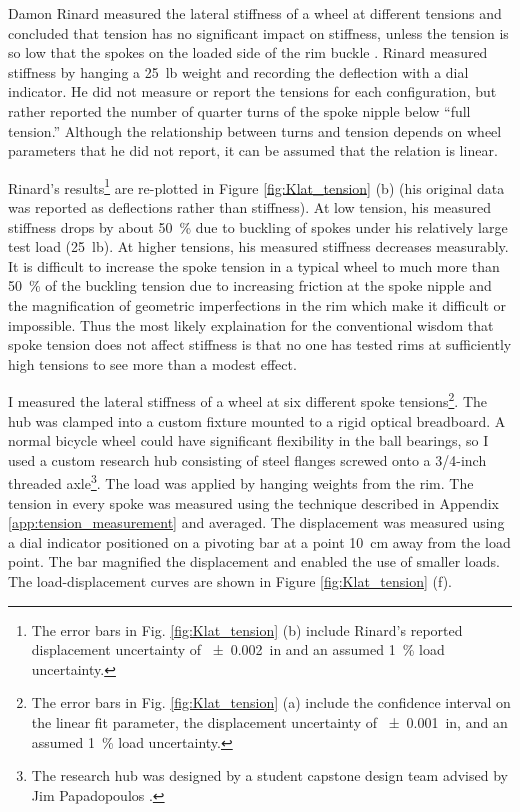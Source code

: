 \documentclass[\rootdir/thesis.tex]{subfiles}
\begin{document}
Damon Rinard measured the lateral stiffness of a wheel at different tensions and concluded that tension has no significant impact on stiffness, unless the tension is so low that the spokes on the loaded side of the rim buckle \cite{Rinard}. Rinard measured stiffness by hanging a \SI{25}{lb} weight and recording the deflection with a dial indicator. He did not measure or report the tensions for each configuration, but rather reported the number of quarter turns of the spoke nipple below ``full tension.'' Although the relationship between turns and tension depends on wheel parameters that he did not report, it can be assumed that the relation is linear.

Rinard's results\footnote{The error bars in Fig. \ref{fig:Klat_tension} (b) include Rinard's reported displacement uncertainty of \SI{+-0.002}{in} and an assumed \SI{1}{\percent} load uncertainty.} are re-plotted in Figure \ref{fig:Klat_tension} (b) (his original data was reported as deflections rather than stiffness). At low tension, his measured stiffness drops by about \SI{50}{\percent} due to buckling of spokes under his relatively large test load (\SI{25}{lb}). At higher tensions, his measured stiffness decreases measurably. It is difficult to increase the spoke tension in a typical wheel to much more than \SI{50}{\percent} of the buckling tension due to increasing friction at the spoke nipple and the magnification of geometric imperfections in the rim which make it difficult or impossible. Thus the most likely explaination for the conventional wisdom that spoke tension does not affect stiffness is that no one has tested rims at sufficiently high tensions to see more than a modest effect.

I measured the lateral stiffness of a wheel at six different spoke tensions\footnote{The error bars in Fig. \ref{fig:Klat_tension} (a) include the confidence interval on the linear fit parameter, the displacement uncertainty of \SI{+-0.001}{in}, and an assumed \SI{1}{\percent} load uncertainty.}. The hub was clamped into a custom fixture mounted to a rigid optical breadboard. A normal bicycle wheel could have significant flexibility in the ball bearings, so I used a custom research hub consisting of steel flanges screwed onto a 3/4-inch threaded axle\footnote{The research hub was designed by a student capstone design team advised by Jim Papadopoulos \cite{Alim2016}.}. The load was applied by hanging weights from the rim. The tension in every spoke was measured using the technique described in Appendix \ref{app:tension_measurement} and averaged. The displacement was measured using a dial indicator positioned on a pivoting bar at a point \SI{10}{cm} away from the load point. The bar magnified the displacement and enabled the use of smaller loads. The load-displacement curves are shown in Figure \ref{fig:Klat_tension} (f).
\end{document}

